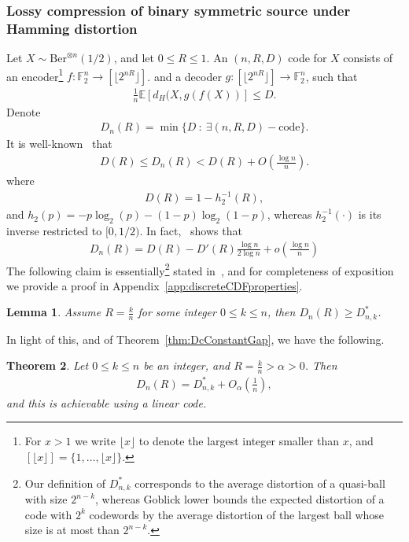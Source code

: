 \documentclass[article,doublecolumn]{IEEEtran}
\newcommand{\F}{{\mathbb{F}}}
\newcommand{\EE}{{\mathbb{E}}}
\newtheorem{thm}{Theorem}[section]
\newtheorem{lem}[thm]{Lemma}
\begin{document}
\subsubsection{Lossy compression of binary symmetric source under Hamming distortion} Let $X\sim\mathrm{Ber}^{\otimes n}(1/2)$, and let $0\leq R\leq 1$. An $(n,R,D)$ code for $X$ consists of an encoder\footnote{For $x>1$ we write $\lfloor x \rfloor$ to denote the largest integer smaller than $x$, and $[\lfloor x \rfloor]=\{1,\ldots,\lfloor x \rfloor\}$.} $f:\F_2^n\to [\lfloor 2^{nR} \rfloor]$. and a decoder $g:[\lfloor 2^{nR} \rfloor]\to\F_2^n$, such that
\begin{align}
\frac{1}{n}\EE[d_H(X,g(f(X))]\leq D.    
\end{align}
Denote
\begin{align}
D_n(R)=\min\{D~:~\exists (n,R,D)-\text{code}\}.    
\end{align}
It is well-known~\cite{CoverThomas,PWbook} that 
\begin{align}
D(R)\leq D_n(R)< D(R)+O\left(\frac{\log n}{n}\right).
\end{align}
where
\begin{align}
D(R)=1-h_2^{-1}(R),    
\end{align}
and $h_2(p)=-p\log_2(p)-(1-p)\log_2(1-p)$, whereas $h_2^{-1}(\cdot)$ is its inverse restricted to $[0,1/2)$.
In fact,~\cite[Theorem 1]{Zhang97} shows that
\begin{align}
D_n(R)=D(R)-D'(R)\frac{\log n}{2\log n}+o\left(\frac{\log n}{n}\right) \end{align}
The following claim is essentially\footnote{Our definition of $D^*_{n,k}$ corresponds to the average distortion of a quasi-ball with size $2^{n-k}$, whereas Goblick lower bounds the expected distortion of a code with $2^k$ codewords by the average distortion of the largest ball whose size is at most than $2^{n-k}$.} stated in~\cite[eq. 4.6-4.7]{goblick1963coding}, and for completeness of exposition we provide a proof in Appendix~\ref{app:discreteCDFproperties}.
\begin{lem}
Assume $R=\frac{k}{n}$ for some integer $0\leq k\leq n$, then $D_n(R)\geq D^*_{n,k}$.
\label{lem:sphereDistortion}
\end{lem}
In light of this, and of Theorem~\ref{thm:DcConstantGap}, we have the following.
\begin{thm}
Let $0\leq k\leq n$ be an integer, and $R=\frac{k}{n}>\alpha>0$. Then
\begin{align}
D_n(R)=D^*_{n,k}+O_{\alpha}\left(\frac{1}{n}\right),    
\end{align}
and this is achievable using a linear code.
\end{thm}
\end{document}
